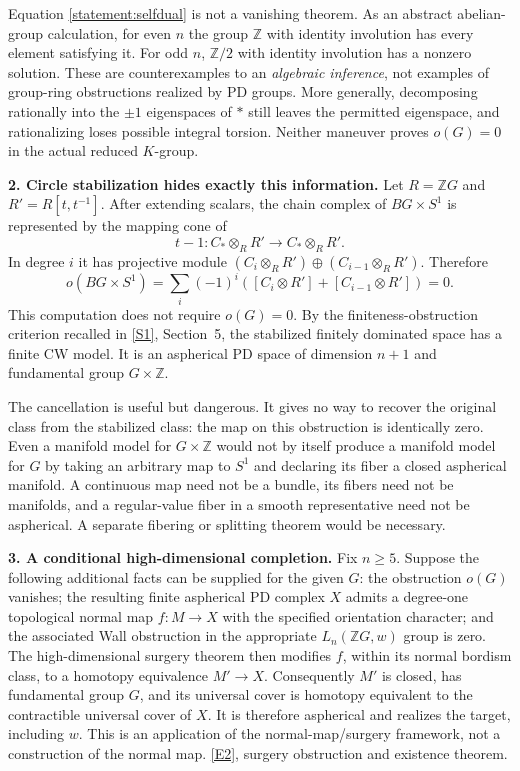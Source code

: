 \documentclass[11pt,a4paper]{article}
\newcommand{\Z}{\mathbb{Z}}
\newcommand{\sref}[2]{\hyperlink{source:#1:#2}{[S#2]}}
\newcommand{\eref}[2]{\hyperlink{extra:#1:#2}{[E#2]}}
\numberwithin{equation}{section}
\begin{document}
Equation \eqref{statement:selfdual} is not a vanishing theorem. As an abstract
abelian-group calculation, for even $n$ the group $\Z$ with identity
involution has every element satisfying it. For odd $n$, $\Z/2$ with
identity involution has a nonzero solution. These are counterexamples to
an \emph{algebraic inference}, not examples of group-ring obstructions
realized by PD groups. More generally, decomposing rationally into the
$\pm1$ eigenspaces of $*$ still leaves the permitted eigenspace, and
rationalizing loses possible integral torsion. Neither maneuver proves
$o(G)=0$ in the actual reduced $K$-group.

\textbf{2. Circle stabilization hides exactly this information.}
Let $R=\Z G$ and $R'=R[t,t^{-1}]$. After extending scalars, the chain
complex of $BG\times S^1$ is represented by the mapping cone of
\[
 t-1:C_*\otimes_RR'\longrightarrow C_*\otimes_RR'.
\]
In degree $i$ it has projective module
$(C_i\otimes_RR')\oplus(C_{i-1}\otimes_RR')$. Therefore
\begin{equation}\label{statement:circle}
 o(BG\times S^1)=\sum_i(-1)^i([C_i\otimes R']+[C_{i-1}\otimes R'])=0.
\end{equation}
This computation does not require $o(G)=0$. By the finiteness-obstruction
criterion recalled in \sref{statement}{1}, Section~5, the stabilized finitely
dominated space has a finite CW model. It is an aspherical PD space of
dimension $n+1$ and fundamental group $G\times\Z$.

The cancellation is useful but dangerous. It gives no way to recover the
original class from the stabilized class: the map on this obstruction is
identically zero. Even a manifold model for $G\times\Z$ would not by
itself produce a manifold model for $G$ by taking an arbitrary map to
$S^1$ and declaring its fiber a closed aspherical manifold. A continuous
map need not be a bundle, its fibers need not be manifolds, and a
regular-value fiber in a smooth representative need not be aspherical.
A separate fibering or splitting theorem would be necessary.

\textbf{3. A conditional high-dimensional completion.}
Fix $n\ge5$. Suppose the following additional facts can be supplied for
the given $G$: the obstruction $o(G)$ vanishes; the resulting finite
aspherical PD complex $X$ admits a degree-one topological normal map
$f:M\to X$ with the specified orientation character; and the associated
Wall obstruction in the appropriate $L_n(\Z G,w)$ group is zero.
The high-dimensional surgery theorem then modifies $f$, within its
normal bordism class, to a homotopy equivalence $M'\to X$.
Consequently $M'$ is closed, has fundamental group $G$, and its universal
cover is homotopy equivalent to the contractible universal cover of $X$.
It is therefore aspherical and realizes the target, including $w$.
This is an application of the normal-map/surgery framework, not a
construction of the normal map. \eref{statement}{2}, surgery obstruction and
existence theorem.
\end{document}
